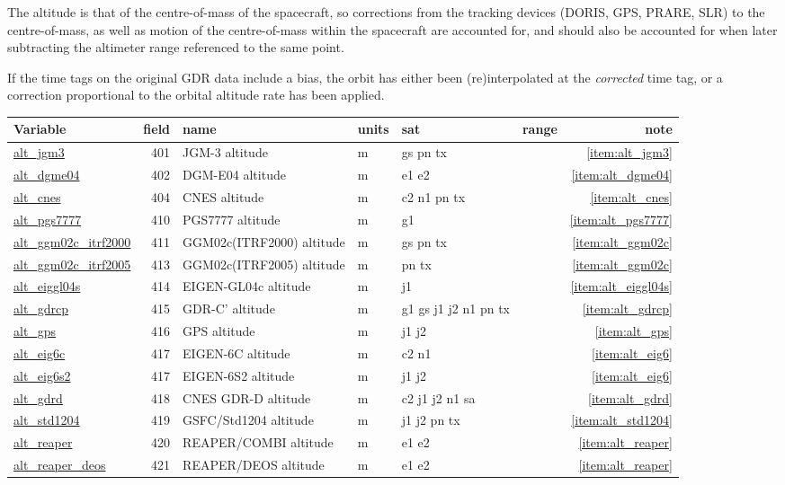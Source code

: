 \documentclass[a4paper,11pt,openany,natbib,nomargin]{thesis}
\makeatletter
\newcommand\var[1]{\url{#1}\index{variables!#1@\protect\url{#1}}}
\newenvironment{vartable}{
\begin{table}[ht]
\small
\begin{tabular}{lrllllr}
\hline
Variable & field & name & units & sat & range & note \\
\hline
}{
\hline
\end{tabular}
\end{table}
}
\makeatother
\begin{document}
The altitude is that of the centre-of-mass of the spacecraft, so corrections from the tracking devices (DORIS, GPS, PRARE, SLR) to the centre-of-mass, as well as motion of the centre-of-mass within the spacecraft are accounted for, and should also be accounted for when later subtracting the altimeter range referenced to the same point.

If the time tags on the original GDR data include a bias, the orbit has either been (re)interpolated at the \emph{corrected} time tag, or a correction proportional to the orbital altitude rate has been applied.

\begin{vartable}
\var{alt_jgm3}     & 401 & JGM-3 altitude   & m & gs pn tx && \ref{item:alt_jgm3} \\
\var{alt_dgme04}   & 402 & DGM-E04 altitude & m & e1 e2 && \ref{item:alt_dgme04} \\
\var{alt_cnes}     & 404 & CNES altitude    & m & c2 n1 pn tx && \ref{item:alt_cnes} \\
\var{alt_pgs7777}  & 410 & PGS7777 altitude  & m & g1 && \ref{item:alt_pgs7777} \\
\var{alt_ggm02c_itrf2000}& 411 & GGM02c(ITRF2000) altitude  & m & gs pn tx && \ref{item:alt_ggm02c} \\
\var{alt_ggm02c_itrf2005}& 413 & GGM02c(ITRF2005) altitude  & m & pn tx && \ref{item:alt_ggm02c} \\
\var{alt_eiggl04s} & 414 & EIGEN-GL04c altitude & m & j1 && \ref{item:alt_eiggl04s} \\
\var{alt_gdrcp}    & 415 & GDR-C' altitude & m & g1 gs j1 j2 n1 pn tx && \ref{item:alt_gdrcp} \\
\var{alt_gps}      & 416 & GPS altitude & m & j1 j2 && \ref{item:alt_gps} \\
\var{alt_eig6c}    & 417 & EIGEN-6C altitude & m & c2 n1 && \ref{item:alt_eig6} \\
\var{alt_eig6s2}   & 417 & EIGEN-6S2 altitude & m & j1 j2 && \ref{item:alt_eig6} \\
\var{alt_gdrd}     & 418 & CNES GDR-D altitude & m & c2 j1 j2 n1 sa && \ref{item:alt_gdrd} \\
\var{alt_std1204}  & 419 & GSFC/Std1204 altitude & m & j1 j2 pn tx && \ref{item:alt_std1204} \\
\var{alt_reaper}   & 420 & REAPER/COMBI altitude & m & e1 e2 && \ref{item:alt_reaper} \\
\var{alt_reaper_deos} & 421 & REAPER/DEOS altitude & m & e1 e2 && \ref{item:alt_reaper} \\

\end{vartable}
\end{document}
